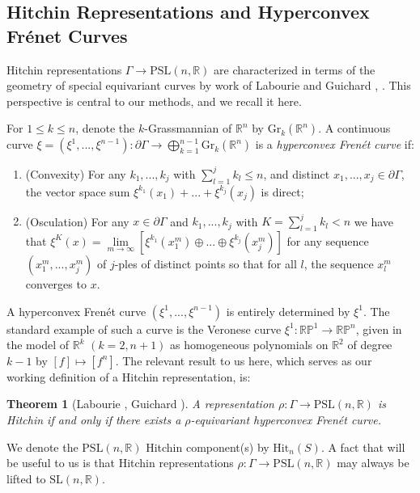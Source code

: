 \documentclass[12pt,a4paper]{amsart}
\newcommand{\bbR}{\mathbb R}
\theoremstyle{definition}
\theoremstyle{plain}
\newtheorem{theorem}{Theorem}[section]
\numberwithin{equation}{section}
\begin{document}
\subsection{Hitchin Representations and Hyperconvex Fr\'enet Curves}

Hitchin representations $\Gamma \to \text{PSL}(n,\mathbb{R})$ are characterized in terms of the geometry of special equivariant curves by work of Labourie and Guichard \cite{labourie2006anosov}, \cite{guichard2008composantes}. This perspective is central to our methods, and we recall it here.

For $1\leq k \leq n$, denote the $k$-Grassmannian of $\mathbb{R}^n$ by $\text{Gr}_k(\mathbb{R}^n)$. A continuous curve $\xi  = (\xi^1, ..., \xi^{n-1}): \partial \Gamma \to \bigoplus_{k=1}^{n-1} \text{Gr}_k(\mathbb{R}^n)$ is a \textit{hyperconvex Fren\'et curve} if:
\begin{enumerate}
    \item (Convexity) For any $k_1,...,k_j$ with $\sum_{l=1}^j k_l \leq n$, and distinct $x_1,..., x_j \in \partial \Gamma$, the vector space sum $\xi^{k_1}(x_1) + ... + \xi^{k_j}(x_j)$ is direct;
    \item (Osculation) For any $x \in \partial \Gamma$ and $k_1,...,k_j$ with $K = \sum_{l=1}^j k_l < n$ we have that $\xi^K(x) = \lim\limits_{m \to \infty} \left[ \xi^{k_1}(x_1^m) \oplus ... \oplus \xi^{k_j}(x_j^m) \right]$ for any sequence $(x_1^m,...,x_j^m)$ of $j$-ples of distinct points so that for all $l$, the sequence $x_l^m $ converges to $x$.
\end{enumerate}

A hyperconvex Fren\'et curve $(\xi^1, ..., \xi^{n-1})$ is entirely determined by $\xi^1$. The standard example of such a curve is the Veronese curve $\xi^1: \mathbb{RP}^1 \to \mathbb{RP}^n$, given in the model of $\mathbb{R}^k$ $(k = 2,n+1)$ as homogeneous polynomials on $\mathbb{R}^2$ of degree $k-1$ by $[f] \mapsto [f^n]$. The relevant result to us here, which serves as our working definition of a Hitchin representation, is:

\begin{theorem}[Labourie \cite{labourie2006anosov}, Guichard \cite{guichard2008composantes}] A representation {\rm{$\rho: \Gamma \to \text{PSL}(n,\bbR)$}} is Hitchin if and only if there exists a $\rho$-equivariant hyperconvex Fren\'et curve.
\end{theorem}

We denote the $\text{PSL}(n,\bbR)$ Hitchin component(s) by $\text{Hit}_n(S)$. A fact that will be useful to us is that Hitchin representations $\rho: \Gamma \to \text{PSL}(n,\bbR)$ may always be lifted to $\text{SL}(n,\bbR)$.
\end{document}

